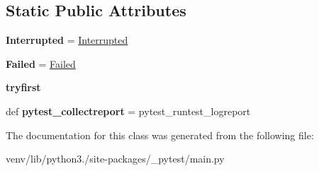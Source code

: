 \subsection*{Static Public Attributes}
\begin{DoxyCompactItemize}
\item 
\mbox{\label{class__pytest_1_1main_1_1_session_a81901ae68b5d715854544e6080deb5ea}} 
{\bfseries Interrupted} = \hyperlink{class__pytest_1_1main_1_1_interrupted}{Interrupted}
\item 
\mbox{\label{class__pytest_1_1main_1_1_session_adc6752cff9b75cb2c0fb3e66149ed7b1}} 
{\bfseries Failed} = \hyperlink{class__pytest_1_1main_1_1_failed}{Failed}
\item 
\mbox{\label{class__pytest_1_1main_1_1_session_a4585de57eb3f2c9177a15cb64a896080}} 
{\bfseries tryfirst}
\item 
\mbox{\label{class__pytest_1_1main_1_1_session_a0b590e659aeedb6f47c4580555600290}} 
def {\bfseries pytest\+\_\+collectreport} = pytest\+\_\+runtest\+\_\+logreport
\end{DoxyCompactItemize}


The documentation for this class was generated from the following file\+:\begin{DoxyCompactItemize}
\item 
venv/lib/python3./site-\/packages/\+\_\+pytest/main.\+py\end{DoxyCompactItemize}
